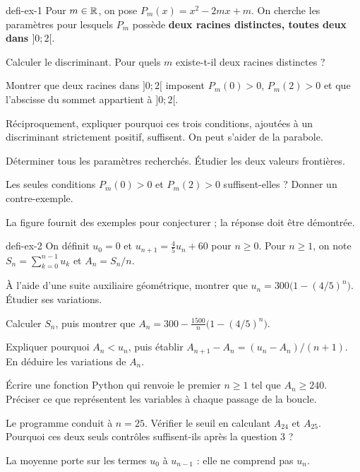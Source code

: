 \begin{blocEdition}{defi-ex-1}
Pour $m\in\mathbb{R}$, on pose $P_m(x)=x^2-2mx+m$. On cherche les paramètres pour
lesquels $P_m$ possède \textbf{deux racines distinctes, toutes deux dans $]0;2[$}.
\begin{questions}
\item Calculer le discriminant. Pour quels $m$ existe-t-il deux racines distinctes ?
\item Montrer que deux racines dans $]0;2[$ imposent $P_m(0)>0$, $P_m(2)>0$
et que l'abscisse du sommet appartient à $]0;2[$.
\item Réciproquement, expliquer pourquoi ces trois conditions, ajoutées à un
discriminant strictement positif, suffisent. On peut s'aider de la parabole.
\item Déterminer tous les paramètres recherchés. Étudier les deux valeurs frontières.
\item Les seules conditions $P_m(0)>0$ et $P_m(2)>0$ suffisent-elles ? Donner un contre-exemple.
\end{questions}
La figure fournit des exemples pour conjecturer ; la réponse doit être démontrée.
\label{figedition-defi-ex-1-1}
\end{blocEdition}

\begin{blocEdition}{defi-ex-2}
On définit $u_0=0$ et $u_{n+1}=\frac45u_n+60$ pour $n\geq0$.
Pour $n\geq1$, on note $S_n=\sum_{k=0}^{n-1}u_k$ et $A_n=S_n/n$.
\begin{questions}
\item À l'aide d'une suite auxiliaire géométrique, montrer que
$u_n=300\bigl(1-(4/5)^n\bigr)$. Étudier ses variations.
\item Calculer $S_n$, puis montrer que
$A_n=300-\frac{1500}{n}\bigl(1-(4/5)^n\bigr)$.
\item Expliquer pourquoi $A_n<u_n$, puis établir
$A_{n+1}-A_n=(u_n-A_n)/(n+1)$. En déduire les variations de $A_n$.
\item Écrire une fonction Python qui renvoie le premier $n\geq1$ tel que $A_n\geq240$.
Préciser ce que représentent les variables à chaque passage de la boucle.
\item Le programme conduit à $n=25$. Vérifier le seuil en calculant $A_{24}$ et $A_{25}$.
Pourquoi ces deux seuls contrôles suffisent-ils après la question 3 ?
\end{questions}
La moyenne porte sur les termes $u_0$ à $u_{n-1}$ : elle ne comprend pas $u_n$.
\end{blocEdition}

